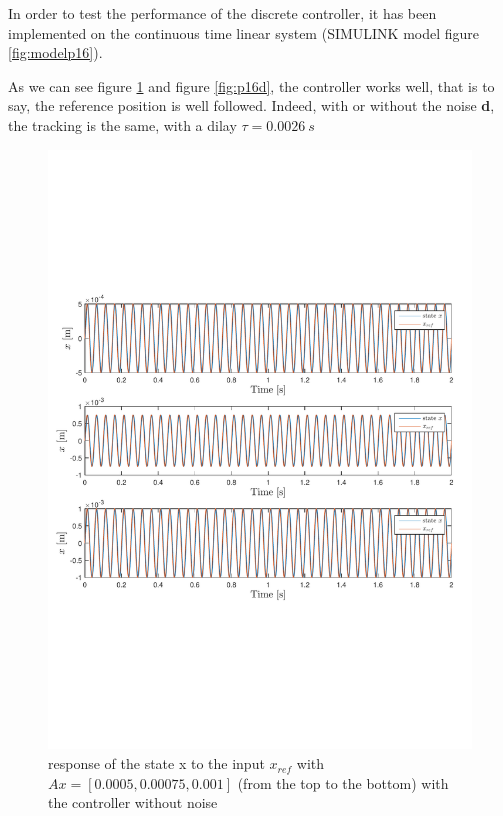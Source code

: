 In order to test the performance of the discrete controller, it has been implemented on the continuous time linear system (SIMULINK model figure \ref{fig:modelp16}).

As we can see figure \ref{fig:p16d0} and figure \ref{fig:p16d}, the controller works well, that is to say, the reference position is well followed. Indeed, with or without the noise \textbf{d}, the tracking is the same, with a dilay $\tau = 0.0026\ s$

\begin{figure}[H]
 \centering 
 \includegraphics[trim=2cm 7cm 2cm 7cm, clip=true, totalheight=0.35\textheight, angle=0]{figures/p16d0.pdf}
 \caption{response of the state x to the input $x_{ref}$ with $Ax = [0.0005,0.00075, 0.001]$ (from the top to the bottom) with the controller without noise}
 \label{fig:p16d0}
\end{figure}

